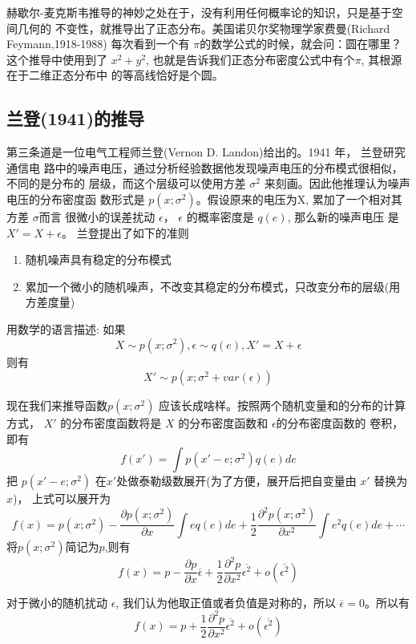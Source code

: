 赫歇尔-麦克斯韦推导的神妙之处在于，没有利用任何概率论的知识，只是基于空间几何的
不变性，就推导出了正态分布。美国诺贝尔奖物理学家费曼(Richard Feymann,1918-1988)
每次看到一个有 $\pi$的数学公式的时候，就会问：圆在哪里？这个推导中使用到了
$x^2+y^2$, 也就是告诉我们正态分布密度公式中有个$\pi$, 其根源在于二维正态分布中
的等高线恰好是个圆。

\subsection{兰登(1941)的推导}

第三条道是一位电气工程师兰登(Vernon D. Landon)给出的。1941 年， 兰登研究通信电
路中的噪声电压，通过分析经验数据他发现噪声电压的分布模式很相似，不同的是分布的
层级，而这个层级可以使用方差 $\sigma^2$ 来刻画。因此他推理认为噪声电压的分布密度函
数形式是 $p(x;\sigma^2)$。假设原来的电压为X, 累加了一个相对其方差 $\sigma$而言
很微小的误差扰动 $\epsilon$， $\epsilon$ 的概率密度是 $q(e)$, 那么新的噪声电压
是 $X' = X + \epsilon$。 兰登提出了如下的准则

\begin{enumerate}
\item 随机噪声具有稳定的分布模式
\item 累加一个微小的随机噪声，不改变其稳定的分布模式，只改变分布的层级(用方差度量)
\end{enumerate}
用数学的语言描述: 如果 $$X \sim p(x;\sigma^2), \epsilon \sim q(e), X'= X+\epsilon$$
则有 $$X' \sim p(x;\sigma^2 + var(\epsilon))$$

现在我们来推导函数$p(x;\sigma^2)$ 应该长成啥样。按照两个随机变量和的分布的计算
方式， $X'$ 的分布密度函数将是 $X$ 的分布密度函数和 $\epsilon$的分布密度函数的
卷积，即有
$$ f(x') = \int p(x'-e; \sigma^2)q(e)de $$
把 $p(x'-e; \sigma^2)$ 在$x'$处做泰勒级数展开(为了方便，展开后把自变量由 $x'$
替换为 $x$)， 上式可以展开为
$$ f(x) = p(x; \sigma^2) - \frac{\partial p(x; \sigma^2)}{\partial x} \int eq(e)de +
\frac{1}{2} \frac{\partial^2 p(x; \sigma^2)}{\partial x^2} \int e^2q(e)de + \cdots
$$
将$p(x; \sigma^2)$简记为$p$,则有
$$ f(x) = p - \frac{\partial p}{\partial x} \overline{\epsilon} +
\frac{1}{2} \frac{\partial^2 p}{\partial x^2}\overline{\epsilon^2} + o(\overline{\epsilon^2})
$$

对于微小的随机扰动 $\epsilon$, 我们认为他取正值或者负值是对称的，所以
$\overline{\epsilon} = 0 $。所以有
\begin{equation}
\label{landon-x}
 f(x) = p + \frac{1}{2} \frac{\partial^2 p}{\partial x^2}\overline{\epsilon^2} + o(\overline{\epsilon^2})
\end{equation}

